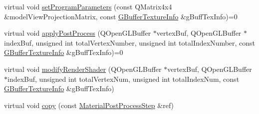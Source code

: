 \begin{DoxyCompactItemize}
\item 
virtual void \mbox{\hyperlink{class_geometry_engine_1_1_custom_shading_1_1_material_post_process_step_ac4b9fa8b3d4fb80b82a9bd43add77f1e}{set\+Program\+Parameters}} (const Q\+Matrix4x4 \&model\+View\+Projection\+Matrix, const \mbox{\hyperlink{class_geometry_engine_1_1_g_buffer_texture_info}{G\+Buffer\+Texture\+Info}} \&g\+Buff\+Tex\+Info)=0
\item 
virtual void \mbox{\hyperlink{class_geometry_engine_1_1_custom_shading_1_1_material_post_process_step_aff4e07a7a77113c487b52bc93c2be0fa}{apply\+Post\+Process}} (Q\+Open\+G\+L\+Buffer $\ast$vertex\+Buf, Q\+Open\+G\+L\+Buffer $\ast$index\+Buf, unsigned int total\+Vertex\+Number, unsigned int total\+Index\+Number, const \mbox{\hyperlink{class_geometry_engine_1_1_g_buffer_texture_info}{G\+Buffer\+Texture\+Info}} \&g\+Buff\+Tex\+Info)=0
\item 
virtual void \mbox{\hyperlink{class_geometry_engine_1_1_custom_shading_1_1_material_post_process_step_aab57c59c6338506f46d110556203a625}{modify\+Render\+Shader}} (Q\+Open\+G\+L\+Buffer $\ast$vertex\+Buf, Q\+Open\+G\+L\+Buffer $\ast$index\+Buf, unsigned int total\+Vertex\+Num, unsigned int total\+Index\+Num, const \mbox{\hyperlink{class_geometry_engine_1_1_g_buffer_texture_info}{G\+Buffer\+Texture\+Info}} \&g\+Buff\+Tex\+Info)
\item 
virtual void \mbox{\hyperlink{class_geometry_engine_1_1_custom_shading_1_1_material_post_process_step_aed622b637ae01f6a3cfa5d7f60c63ac6}{copy}} (const \mbox{\hyperlink{class_geometry_engine_1_1_custom_shading_1_1_material_post_process_step}{Material\+Post\+Process\+Step}} \&ref)
\end{DoxyCompactItemize}
